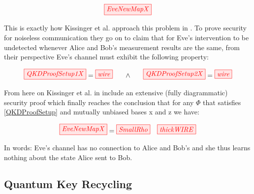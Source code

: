 \documentclass[]{article}
\begin{document}
\begin{equation}
	\label{equation:EveNewMap}
	\tikzfig{EveNewMapX}
\end{equation}

This is exactly how Kissinger et al. approach this problem in \cite{Kissinger2017}. To prove security for noiseless communication they go on to claim that for Eve's intervention to be undetected whenever Alice and Bob's measurement results are the same, from their perspective Eve's channel must exhibit the following property:

\begin{equation}
	\label{QKDProofSetup}
	\tikzfig{QKDProofSetup1X} = \tikzfig{wire} ~~~~~ \land ~~~~~ \tikzfig{QKDProofSetup2X} = \tikzfig{wire}
\end{equation}

From here on Kissinger et al. in \cite{Kissinger2017} include an extensive (fully diagrammatic) security proof which finally reaches the conclusion that for any $\Phi$ that satisfies \ref{QKDProofSetup} and mutually unbiased bases x and z we have:

\begin{equation}
\tikzfig{EveNewMapX} = \tikzfig{SmallRho}  ~~~ \tikzfig{thickWIRE}
\end{equation}

In words: Eve's channel has no connection to Alice and Bob's and she thus learns nothing about the state Alice sent to Bob.


\subsection{Quantum Key Recycling}
\label{section:qkr}
\end{document}
